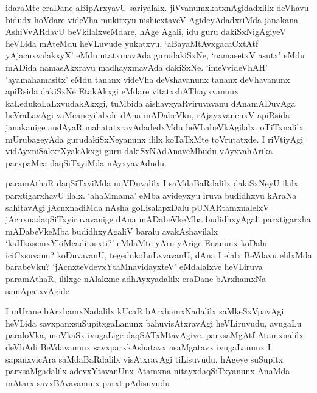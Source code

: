 \begin{artha}
idaraMte eraDane aBipArxyavU sariyalalx. jiVvanumxkatxnAgidadxlilx deVhavu bidudx hoVdare videVha mukitxyu nishicxtaveV AgideyAdadxriMda janakana AshiVvARdavU beVkilalxveMdare, hAge Agali, idu guru dakiSxNigAgiyeV heVLida mAteMdu heVLuvude yukatxvu, `aBayaMtAvxgacaCxtAtf yAjacnxvalakxyX' eMdu utatxmavAda gurudakiSxNe, `namasetxV asutx' eMdu mADida namasAkxravu madhayxmavAda dakiSxNe. `imeVvideVhAH' `ayamahamasitx' eMdu tananx videVha deVshavanunx tananx deVhavanunx apiRsida dakiSxNe EtakAkxgi eMdare vitatxshAThayxvanunx kaLedukoLaLxvudakAkxgi, tuMbida aishavxyaRviruvavanu dAnamADuvAga heVraLavAgi vaMcaneyilalxde dAna mADabeVku, rAjayxvanenxV apiRsida janakanige audAyaR mahatatxravAdadedxMdu heVLabeVkAgilalx. oTiTxnalilx mUrubageyAda gurudakiSxNeyanunx ililx koTaTxMte toVrutatxde. I riVtiyAgi vidAyxniSakxrXyakAkxgi guru dakiSxNAdAnaveMbudu vAyxvahArika parxpaMca daqSiTxyiMda nAyxyavAdudu. 
\end{artha}


\begin{artha}
paramAthaR daqSiTxyiMda noVDuvalilx I saMdaBaRdalilx dakiSxNeyU ilalx parxtigarxhavU ilalx. `ahaMmama' eMba avideyxyu iruva budidhxyu kAraNa sahitavAgi jAcnxnadiMda nAsha goLisalapxDalu pUNARtamxnalelxV jAcnxnadaqSiTxyiruvavanige dAna mADabeVkeMba budidhxyAgali parxtigarxha mADabeVkeMba budidhxyAgaliV baralu avakAshavilalx `kaHkasemxYkiMcaditasxti?' eMdaMte yAru yArige Enanunx koDalu iciCxsuvanu? koDuvavanU, tegedukoLuLxvavanU, dAna I elalx BeVdavu elilxMda barabeVku? `jAcnxteVdevxYtaMnavidayxteV' eMdalalxve heVLiruva paramAthaR, ililxge nAlakxne adhAyxyadalilx eraDane bArxhamxNa samApatxvAgide
\end{artha}



\begin{artha}
I mUrane bArxhamxNadalilx kUcaR bArxhamxNadalilx saMkeSxVpavAgi heVLida savxpanxsuSupitxgaLanunx bahuvisAtxravAgi heVLiruvudu, avugaLu paraloVka, moVkaSx ivugaLige daqSATxMtavAgive. parxsaMgAtf Atamxnalilx deVhAdi BeVdavanunx savxparxkAshatavx asaMgatavx ivugaLanunx I sapanxvicAra saMdaBaRdalilx visAtxravAgi tiLisuvudu, hAgeye suSupitx parxsaMgadalilx adevxYtavanUnx Atamxna nitayxdaqSiTxyanunx AnaMda mAtarx savxBAvavanunx parxtipAdisuvudu
\end{artha}

